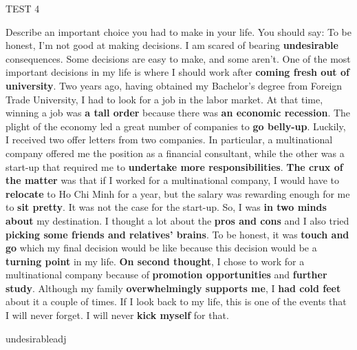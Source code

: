 \begin{glossarymc}[Cambridge 6]
\begin{test}{TEST 4}
\begin{qa}{Describe an important choice you had to make in your life. You should say:}
    To be honest, I'm not good at making decisions. I am scared of bearing \textbf{undesirable} consequences. Some decisions are easy to make, and some aren't. One of the most important decisions in my life is where I should work after \textbf{coming fresh out of university}. Two years ago, having obtained my Bachelor's degree from Foreign Trade University, I had to look for a job in the labor market. At that time, winning a job was \textbf{a tall order} because there was \textbf{an economic recession}. The plight of the economy led a great number of companies to \textbf{go belly-up}. Luckily, I received two offer letters from two companies. In particular, a multinational company offered me the position as a financial consultant, while the other was a start-up that required me to \textbf{undertake more responsibilities}. \textbf{The crux of the matter} was that if I worked for a multinational company, I would have to \textbf{relocate} to Ho Chi Minh for a year, but the salary was rewarding enough for me to \textbf{sit pretty}. It was not the case for the start-up. So, I was \textbf{in two minds about} my destination. I thought a lot about the \textbf{pros and cons} and I also tried \textbf{picking some friends and relatives' brains}. To be honest, it was \textbf{touch and go} which my final decision would be like because this decision would be a \textbf{turning point} in my life. \textbf{On second thought}, I chose to work for a multinational company because of \textbf{promotion opportunities} and \textbf{further study}. Although my family \textbf{overwhelmingly supports me}, I \textbf{had cold feet} about it a couple of times. If I look back to my life, this is one of the events that I will never forget. I will never \textbf{kick myself} for that.
    \end{qa}


        \begin{VocabExplain}[Part 2]
            \begin{ExplainCard}{undesirable}{adj}
            \end{ExplainCard}


\end{VocabExplain}
\end{test}
\end{glossarymc}
